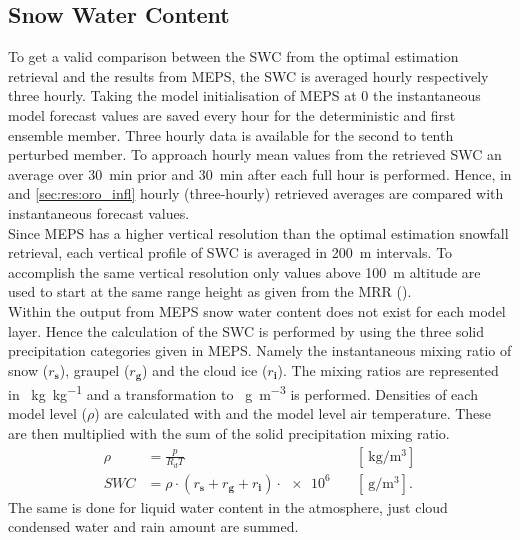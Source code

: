 \subsection{Snow Water Content}
To get a valid comparison between the SWC from the optimal estimation retrieval and the results from MEPS, the SWC is averaged hourly respectively three hourly. Taking the model initialisation of MEPS at \SI{0}{\UTC} the instantaneous model forecast values are saved every hour for the deterministic and first ensemble member. Three hourly data is available for the second to tenth perturbed member. To approach hourly mean values from the retrieved SWC an average over \SI{30}{\minute} prior and \SI{30}{\minute} after each full hour is performed. %
Hence, in  and \ref{sec:res:oro_infl} hourly (three-hourly) retrieved averages are compared with instantaneous forecast values.
\\
Since MEPS has a higher vertical resolution than the optimal estimation snowfall retrieval, each vertical profile of SWC is averaged in \SI{200}{\metre} intervals. To accomplish the same vertical resolution only values above \SI{100}{\metre} altitude are used to start at the same range height as given from the MRR ().
\\
Within the output from MEPS snow water content does not exist for each model layer. Hence the calculation of the SWC is performed by using the three solid precipitation categories given in MEPS. Namely the instantaneous mixing ratio of snow ($r_\mathbf{s}$), graupel  ($r_\mathbf{g}$) and the cloud ice ($r_\mathbf{i}$). The mixing ratios are represented in \SI{}{\kg\per\kg} and a transformation to \SI{}{\g\per\cubic\meter} is performed. Densities of each model level ($\rho$) are calculated with  and the model level air temperature. These are then multiplied with the sum of the solid precipitation mixing ratio. 
\begin{align}
	\rho & = \frac{p}{R_d T} & \quad [\SI{}{\kg\per\cubic\meter}]  \\
	SWC & = \rho \cdot (r_\mathbf{s} + r_\mathbf{g} + r_\mathbf{i}) \cdot \num{e6} & \quad [\SI{}{\g\per\cubic\meter}].
	\label{eq:SWC_ml}
\end{align}
The same is done for liquid water content in the atmosphere, just cloud condensed water and rain amount are summed.

